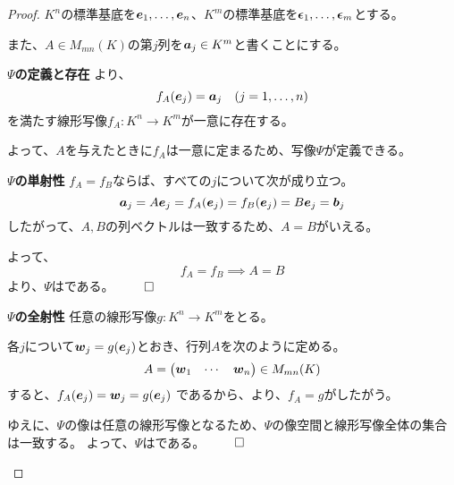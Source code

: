 \documentclass[../../../topic_linear-algebra]{subfiles}
\begin{document}
\begin{proof}
  $K^n$の標準基底を$\vb*{e}_1,\dots,\vb*{e}_n$、$K^m$の標準基底を$\vb*{\epsilon}_1,\dots,\vb*{\epsilon}_m$とする。

  また、$A\in M_{mn}(K)$の第$j$列を$\vb*{a}_j\in K^m$と書くことにする。
  
  \begin{subpattern}{\bfseries $\Psi$の定義と存在}
    より、
    \begin{equation*}
      f_A(\vb*{e}_j) = \vb*{a}_j \quad (j=1,\dots,n)
    \end{equation*}
    を満たす線形写像$f_A\colon K^n\to K^m$が一意に存在する。
    
    よって、$A$を与えたときに$f_A$は一意に定まるため、写像$\Psi$が定義できる。
  \end{subpattern}
  
  \begin{subpattern}{\bfseries $\Psi$の単射性}
    $f_A=f_B$ならば、すべての$j$について次が成り立つ。
    \begin{equation*}
      \vb*{a}_j = A\vb*{e}_j =f_A(\vb*{e}_j)=f_B(\vb*{e}_j)=B\vb*{e}_j = \vb*{b}_j
    \end{equation*}
    したがって、$A,B$の列ベクトルは一致するため、$A=B$がいえる。
    
    よって、
    \begin{equation*}
      f_A = f_B \implies A = B
    \end{equation*}
    より、$\Psi$はである。 $\qed$
  \end{subpattern}
  
  \begin{subpattern}{\bfseries $\Psi$の全射性}
    任意の線形写像$g\colon K^n \to K^m$をとる。
    
    各$j$について$\vb*{w}_j=g(\vb*{e}_j)$とおき、行列$A$を次のように定める。
    \begin{equation*}
      A= \begin{pmatrix}
        \vb*{w}_1 & \cdots & \vb*{w}_n
      \end{pmatrix} \in M_{mn}(K)
    \end{equation*}
    すると、$f_A(\vb*{e}_j)=\vb*{w}_j=g(\vb*{e}_j)$ であるから、より、$f_A=g$がしたがう。
    
    \br
    
    ゆえに、$\Psi$の像は任意の線形写像となるため、$\Psi$の像空間と線形写像全体の集合は一致する。
    よって、$\Psi$はである。 $\qed$
  \end{subpattern}
  

\end{proof}
\end{document}

